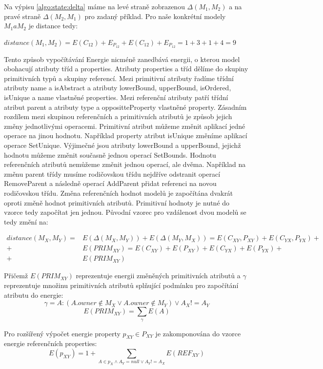 \documentclass[11pt,twoside,a4paper]{book}
\begin{document}
Na výpisu \ref{algo:state:delta} máme na levé straně zobrazenou
$\Delta(M_1,M_2)$ a na pravé straně $\Delta(M_2,M_1)$ pro zadaný příklad. Pro
naše konkrétní modely $M_1 a M_2$ je distance tedy:

$distance(M_1,M_2) = E(C_{12}) + E_{P_{12}} + E(C_{12}) + E_{P_{12}} = 1 + 3 +
1 + 4 = 9$

Tento způsob vypočítávání Energie nicméně zanedbává energii, o kterou model
obohacují atributy tříd a properties. Atributy properties a tříd dělíme do
skupiny primitivních typů a skupiny referencí. Mezi primitivní atributy řadíme
třídní atributy name a isAbstract a atributy lowerBound, upperBound,
isOrdered, isUnique a name vlastněné properties. Mezi referenční atributy patří
třídní atribut parent a atributy type a oppositteProperty vlastněné property. Zásadním
rozdílem mezi skupinou referenčních a primitivních atributů je způsob jejich
změny jednotlivými operacemi. Primitivní atribut můžeme změnit aplikací jedné
operace na jinou hodnotu. Například property atribut isUnique změníme
aplikací operace SetUnique. Výjimečné jsou atributy lowerBound a upperBound,
jejichž hodnotu můžeme změnit současně jednou operací SetBounds.
Hodnotu referenčních atributů nemůžeme změnit jednou operací, ale
dvěma. Například na změnu parent třídy musíme rodičovskou třídu nejdříve
odstranit operací RemoveParent a následně operací AddParent přidat
referenci na novou rodičovskou třídu. Změna referenčních hodnot modelů je
započítána dvakrát oproti změně hodnot primitivních atributů. Primitivní
hodnoty je nutné do vzorce tedy započítat jen jednou. Původní vzorec pro
vzdálenost dvou modelů se tedy změní na:

\begin{align} distance(M_X,M_Y) = & E(\Delta(M_X,M_Y)) + E(\Delta(M_Y, M_X)) =
E(C_{XY}, P_{XY}) + E(C_{YX}, P_{YX}) + \nonumber \\ + & E(PRIM_{XY}) = 
E(C_{XY}) + E(P_{XY}) + E(C_{YX}) + E(P_{YX}) + \nonumber \\ + & E(PRIM_{XY})
\nonumber
\end{align}

Přičemž $E(PRIM_{XY})$ reprezentuje energii změněných primitivních atributů a
$\gamma$ reprezentuje množinu primitivních atributů splňující podmínku pro
započítání atributu do energie:
$$\gamma=A: (A.owner \notin M_{X} \vee A.owner \notin M_{Y})
\vee A_{X} != A_{Y} $$
$$E(PRIM_{XY}) = \sum_{\gamma}E(A)$$

Pro rozšířený výpočet energie property $p_{XY} \in P_{XY}$ je zakomponována do
vzorce energie referenčních properties:
$$E(p_{XY}) = 1 + \sum_{A \in p_X \wedge A_Y = null \vee A_Y !=
A_X}E(REF_{XY})$$
\end{document}
